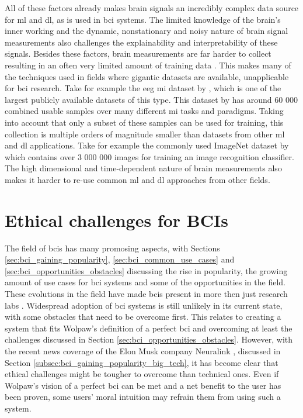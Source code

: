 All of these factors already makes brain signals an incredibly complex data source for \gls{ml} and \gls{dl}, as is used in \gls{bci} systems.
The limited knowledge of the brain's inner working and the dynamic, nonstationary and noisy nature of brain signal measurements also challenges the explainability and interpretability of these signals.
Besides these factors, brain measurements are far harder to collect resulting in an often very limited amount of training data \citep{bci_applications}.
This makes many of the techniques used in fields where gigantic datasets are available, unapplicable for \gls{bci} research.
Take for example the \gls{eeg} \gls{mi} dataset by \citet{eeg_data}, which is one of the largest publicly available datasets of this type.
This dataset by \citet{eeg_data} has around 60 000 combined usable samples over many different \gls{mi} tasks and paradigms.
Taking into account that only a subset of these samples can be used for training, this collection is multiple orders of magnitude smaller than datasets from other \gls{ml} and \gls{dl} applications.
Take for example the commonly used ImageNet dataset by \citet{imagenet} which contains over 3 000 000 images for training an image recognition classifier.
The high dimensional and time-dependent nature of brain measurements also makes it harder to re-use common \gls{ml} and \gls{dl} approaches from other fields.



 





\section{Ethical challenges for BCIs}
\label{sec:bci_ethical}


The field of \glspl{bci} has many promosing aspects, with Sections \ref{sec:bci_gaining_popularity}, \ref{sec:bci_common_use_cases} and \ref{sec:bci_opportunities_obstacles} discussing the rise in popularity, the growing amount of use cases for \gls{bci} systems and some of the opportunities in the field.
These evolutions in the field have made \glspl{bci} present in more then just research labs \citep{ethical_dillemas,bci_applications}.
Widespread adoption of \gls{bci} systems is still unlikely in its current state, with some obstacles that need to be overcome first.
This relates to creating a system that fits Wolpaw's definition of a perfect \gls{bci} and overcoming at least the challenges discussed in Section \ref{sec:bci_opportunities_obstacles}.
However, with the recent news coverage of the Elon Musk company Neuralink \citep{neuralink_whitepaper}, discussed in Section \ref{subsec:bci_gaining_popularity_big_tech}, it has become clear that ethical challenges might be tougher to overcome than technical ones.
Even if Wolpaw's vision of a perfect \gls{bci} can be met and a net benefit to the user has been proven, some users' moral intuition may refrain them from using such a system.

